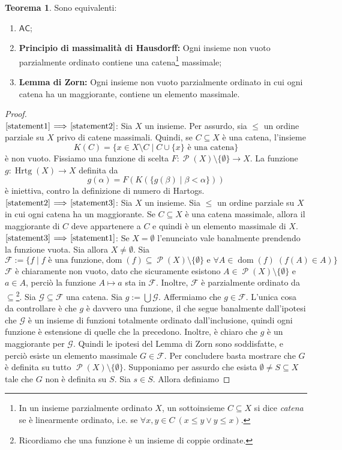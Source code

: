 \documentclass[12pt,a4paper]{report}
\theoremstyle{definition}
\newtheorem{teo}{Teorema}[section]  %
\theoremstyle{num.custom-title}
\DeclareMathOperator{\dom}{dom}
\DeclareMathOperator{\PP}{\mathcal{P}}
\DeclareMathOperator{\Hrtg}{\text{Hrtg}}
\DeclareMathOperator{\sm}{\setminus}
\DeclareMathOperator{\sse}{\subseteq}
\newcommand{\AC}{\ensuremath{\mathsf{AC}}\xspace}
\newcommand{\Implies}[2]{$\text{\ref{statement#1}}\!\implies\!\text{\ref{statement#2}}$}%
\newcommand{\punto}[1]{\item \label{statement#1}}
\newenvironment{equivalence}
    {\begin{enumerate}[label=(\arabic*),ref=(\arabic*)]
    }
    { 
	\end{enumerate}
    }
\begin{document}
\begin{teo} Sono equivalenti:
\begin{equivalence}
\punto{1} \AC;
\punto{2} \textbf{Principio di massimalità di Hausdorff:} Ogni insieme non vuoto parzialmente ordinato contiene una catena\footnote{In un insieme parzialmente ordinato $X$, un sottoinsieme $C \sse X$ si dice \emph{catena} se è linearmente ordinato, i.e. se $\forall x,y \in C \ (x \leq y \vee y \leq x)$.} massimale;
\punto{3} \textbf{Lemma di Zorn:} Ogni insieme non vuoto parzialmente ordinato in cui ogni catena ha un maggiorante, contiene un elemento massimale.
\end{equivalence}
\begin{proof}\ \\
\Implies{1}{2}: Sia $X$ un insieme. Per assurdo, sia $\leq$ un ordine parziale su $X$ privo di catene massimali. Quindi, se $C \subseteq X$ è una catena, l'insieme
\[
K(C) = \{x \in X \sm C \mid C \cup \{x\} \text{ è una catena}\}
\]
è non vuoto. Fissiamo una funzione di scelta $F: \PP(X) \sm \{\emptyset\} \to X$. La funzione $g: \Hrtg(X) \to X$ definita da 
\[
g(\alpha) = F(K(\{g(\beta) \mid \beta < \alpha\}))
\]
è iniettiva, contro la definizione di numero di Hartogs.\\
\Implies{2}{3}: Sia $X$ un insieme. Sia $\leq$ un ordine parziale su $X$ in cui ogni catena ha un maggiorante. Se $C \subseteq X$ è una catena massimale, allora il maggiorante di $C$ deve appartenere a $C$ e quindi è un elemento massimale di $X$.\\
\Implies{3}{1}: Se $X=\emptyset$ l'enunciato vale banalmente prendendo la funzione vuota. Sia allora $X \neq \emptyset$. Sia
\[
\mathcal{F}:=\{f \mid f \text{ è una funzione,} \dom(f) \subseteq \PP(X) \sm \{\emptyset\} \text{ e } \forall A \in \dom(f) \; (f(A) \in A)\}
\]
$\mathcal{F}$ è chiaramente non vuoto, dato che sicuramente esistono $A \in \PP(X) \sm \{\emptyset\}$ e $a \in A$, perciò la funzione $A \mapsto a$ sta in $\mathcal{F}$. Inoltre, $\mathcal{F}$ è parzialmente ordinato da $\subseteq$\footnote{Ricordiamo che una funzione è un insieme di coppie ordinate.}. Sia $\mathcal{G} \subseteq \mathcal{F}$ una catena. Sia $g:=\bigcup \mathcal{G}$. Affermiamo che $g \in \mathcal{F}$. L'unica cosa da controllare è che $g$ è davvero una funzione, il che segue banalmente dall'ipotesi che $\mathcal{G}$ è un insieme di funzioni totalmente ordinato dall'inclusione, quindi ogni funzione è estensione di quelle che la precedono. Inoltre, è chiaro che $g$ è un maggiorante per $\mathcal{G}$. Quindi le ipotesi del Lemma di Zorn sono soddisfatte, e perciò esiste un elemento massimale $G \in \mathcal{F}$. Per concludere basta mostrare che $G$ è definita su tutto $\PP(X) \sm \{\emptyset\}$. Supponiamo per assurdo che esista $\emptyset \neq S \subseteq X$ tale che $G$ non è definita su $S$. Sia $s \in S$. Allora definiamo 

\end{proof}
\end{teo}
\end{document}
